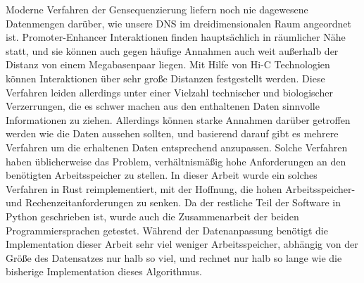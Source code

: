 Moderne Verfahren der Gensequenzierung liefern noch nie dagewesene Datenmengen
darüber, wie unsere DNS im dreidimensionalen Raum angeordnet ist.
Promoter-Enhancer Interaktionen finden hauptsächlich in räumlicher Nähe statt,
und sie können auch gegen häufige Annahmen auch weit außerhalb der Distanz von
einem Megabasenpaar liegen. Mit Hilfe von Hi-C Technologien können
Interaktionen über sehr große Distanzen festgestellt werden. Diese Verfahren
leiden allerdings unter einer Vielzahl technischer und biologischer
Verzerrungen, die es schwer machen aus den enthaltenen Daten sinnvolle
Informationen zu ziehen. Allerdings können starke Annahmen darüber getroffen
werden wie die Daten aussehen sollten, und basierend darauf gibt es mehrere
Verfahren um die erhaltenen Daten entsprechend anzupassen. Solche Verfahren
haben üblicherweise das Problem, verhältnismäßig hohe Anforderungen an den
benötigten Arbeitsspeicher zu stellen.
In dieser Arbeit wurde ein solches Verfahren in Rust reimplementiert,
mit der Hoffnung, die hohen Arbeitsspeicher- und Rechenzeitanforderungen
zu senken. Da der restliche Teil der Software in Python geschrieben ist, wurde
auch die Zusammenarbeit der beiden Programmiersprachen getestet.
Während der Datenanpassung benötigt die Implementation dieser Arbeit sehr viel
weniger Arbeitsspeicher, abhängig von der Größe des Datensatzes nur halb so
viel, und rechnet nur halb so lange wie die bisherige Implementation dieses
Algorithmus.


